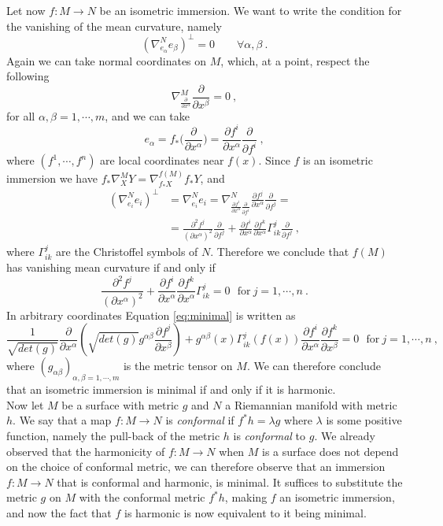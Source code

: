Let now $f:M \to N$ be an isometric immersion. We want to write the condition for the vanishing of the mean curvature, namely
\[
    (\nabla^N_{e_\alpha} e_\beta)^\perp = 0 \qquad \forall \alpha, \beta \ .
\]
Again we can take normal coordinates on $M$, which, at a point, respect the following
\[
    \nabla^M_{\frac{\partial}{\partial x^\alpha}}  \frac{\partial}{\partial x^\beta} = 0 \ ,
\]
for all $\alpha, \beta = 1, \cdots, m$, and we can take
\[
    e_\alpha = f_*\Big( \frac{\partial}{\partial x^\alpha} \Big) = \frac{\partial f^i}{\partial x^\alpha} \frac{\partial}{\partial f^i} \ ,
\]
where $(f^1, \cdots, f^n)$ are local coordinates near $f(x)$.
Since $f$ is an isometric immersion we have $f_* \nabla^M_X Y = \nabla^{f(M)}_{f_* X} f_* Y$, and
\[
\begin{split}
    (\nabla^N_{e_i} e_i)^\perp & = \nabla^N_{e_i} e_i = \nabla^N_{\frac{\partial f^i}{\partial x^\alpha} \frac{\partial}{\partial f^i}}  \frac{\partial f^j}{\partial x^\alpha} \frac{\partial}{\partial f^j} = \\
    & = \frac{\partial^2 f^j}{(\partial x^\alpha)^2} \frac{\partial}{\partial f^j} + \frac{\partial f^i}{\partial x^\alpha} \frac{\partial f^k}{\partial x^\alpha} \Gamma^j_{ik} \frac{\partial}{\partial f^j} \ ,
\end{split}
\]
where $\Gamma^j_{ik}$ are the Christoffel symbols of $N$. Therefore we conclude that $f(M)$ has vanishing mean curvature if and only if
\begin{equation}\label{eq:minimal}
    \frac{\partial^2 f^j}{(\partial x^\alpha)^2} + \frac{\partial f^i}{\partial x^\alpha} \frac{\partial f^k}{\partial x^\alpha} \Gamma^j_{ik}  = 0 \ \ \ \text{for} \ j=1, \cdots, n \ .
\end{equation}
In arbitrary coordinates Equation \ref{eq:minimal} is written as
\[
    \frac{1}{\sqrt{det(g)}} \frac{\partial}{\partial x^\alpha}(\sqrt{det(g)} g^{\alpha\beta} \frac{\partial f^j}{\partial x^\beta}) + g^{\alpha\beta}(x) \Gamma^j_{ik}(f(x)) \frac{\partial f^i}{\partial x^\alpha}  \frac{\partial f^k}{\partial x^\beta} = 0  \ \ \ \text{for} \ j=1, \cdots, n \ ,
\]
where $(g_{\alpha \beta})_{\alpha,\beta = 1,\cdots,m}$ is the metric tensor on $M$.
We can therefore conclude that an isometric immersion is minimal if and only if it is harmonic.\\
Now let $M$ be a surface with metric $g$ and $N$ a Riemannian manifold with metric $h$. We say that a map $f:M \to N$ is \textit{conformal} if $f^* h = \lambda g$ where $\lambda$ is some positive function, namely the pull-back of the metric $h$ is \textit{conformal} to $g$. We already observed that the harmonicity of $f:M \to N$ when $M$ is a surface does not depend on the choice of conformal metric, we can therefore observe that an immersion $f:M \to N$ that is conformal and harmonic, is minimal. It suffices to substitute the metric $g$ on $M$ with the conformal metric $f^* h$, making $f$ an isometric immersion, and now the fact that $f$ is harmonic is now equivalent to it being minimal.\\
